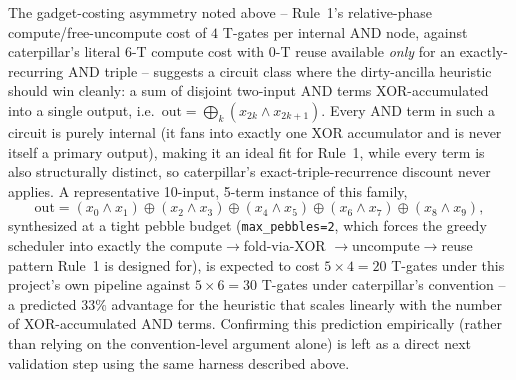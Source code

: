 The gadget-costing asymmetry noted above -- Rule~1's relative-phase
compute/free-uncompute cost of $4$ T-gates per internal AND node,
against caterpillar's literal $6$-T compute cost with $0$-T reuse
available \emph{only} for an exactly-recurring AND triple -- suggests
a circuit class where the dirty-ancilla heuristic should win cleanly:
a sum of disjoint two-input AND terms XOR-accumulated into a single
output, i.e.\ $\mathrm{out} = \bigoplus_{k} (x_{2k} \wedge x_{2k+1})$.
Every AND term in such a circuit is purely internal (it fans into
exactly one XOR accumulator and is never itself a primary output),
making it an ideal fit for Rule~1, while every term is also
structurally distinct, so caterpillar's exact-triple-recurrence
discount never applies. A representative 10-input, 5-term instance
of this family,
\[
\mathrm{out} = (x_0 \wedge x_1) \oplus (x_2 \wedge x_3) \oplus
(x_4 \wedge x_5) \oplus (x_6 \wedge x_7) \oplus (x_8 \wedge x_9),
\]
synthesized at a tight pebble budget (\texttt{max\_pebbles=2}, which
forces the greedy scheduler into exactly the compute$\to$fold-via-XOR
$\to$uncompute$\to$reuse pattern Rule~1 is designed for), is expected
to cost $5 \times 4 = 20$ T-gates under this project's own pipeline
against $5 \times 6 = 30$ T-gates under caterpillar's convention --
a predicted $33\%$ advantage for the heuristic that scales linearly
with the number of XOR-accumulated AND terms. Confirming this
prediction empirically (rather than relying on the convention-level
argument alone) is left as a direct next validation step using the
same harness described above.
